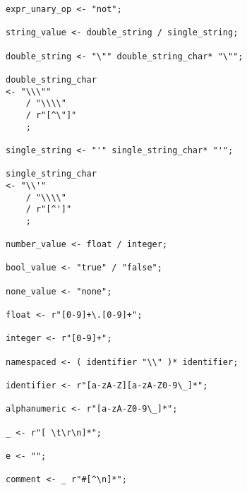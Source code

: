 \begin{lstlisting}
expr_unary_op <- "not";

string_value <- double_string / single_string;

double_string <- "\"" double_string_char* "\"";

double_string_char 
<- "\\\""
    / "\\\\"
    / r"[^\"]"
    ;

single_string <- "'" single_string_char* "'";

single_string_char
<- "\\'"
    / "\\\\"
    / r"[^']"
    ;

number_value <- float / integer;

bool_value <- "true" / "false";

none_value <- "none";

float <- r"[0-9]+\.[0-9]+";

integer <- r"[0-9]+";

namespaced <- ( identifier "\\" )* identifier;

identifier <- r"[a-zA-Z][a-zA-Z0-9\_]*";

alphanumeric <- r"[a-zA-Z0-9\_]*";

_ <- r"[ \t\r\n]*";

e <- "";

comment <- _ r"#[^\n]*";
\end{lstlisting}
